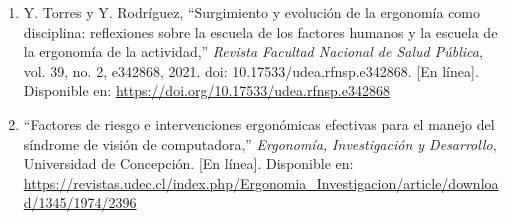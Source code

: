 \begin{enumerate}[leftmargin=1.8em,label=\lbrack\arabic*\rbrack,itemsep=0.6em]
\item Y. Torres y Y. Rodríguez, ``Surgimiento y evolución de la ergonomía como disciplina: reflexiones sobre la escuela de los factores humanos y la escuela de la ergonomía de la actividad,'' \emph{Revista Facultad Nacional de Salud Pública}, vol. 39, no. 2, e342868, 2021. doi: 10.17533/udea.rfnsp.e342868. [En línea]. Disponible en: \url{https://doi.org/10.17533/udea.rfnsp.e342868}

\item %
``Factores de riesgo e intervenciones ergonómicas efectivas para el manejo del síndrome de visión de computadora,'' \emph{Ergonomía, Investigación y Desarrollo}, Universidad de Concepción. [En línea]. Disponible en: \url{https://revistas.udec.cl/index.php/Ergonomia_Investigacion/article/download/1345/1974/2396}

\end{enumerate}


